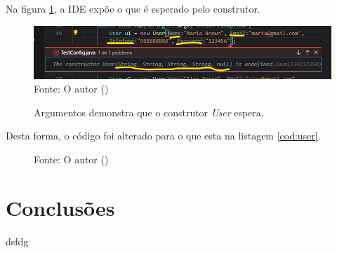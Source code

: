 \par Na figura \ref{fig:sugconstrutor}, a IDE expõe o que é esperado pelo construtor.

\begin{figure}[H]
  \caption{Argumentos demonstra que o construtor \textit{User} espera.}
  \includegraphics[scale=0.8]{figure/user_jaova.png}
  \label{fig:sugconstrutor}
  \flushleft %
  {\fontsize{10pt}{\baselineskip}\selectfont  Fonte: O autor (\the\year) }
\end{figure}
\par Desta forma, o código foi alterado para o que esta na listagem \ref{cod:user}.


\begin{figure}[H]
  \flushleft %
  {\fontsize{10pt}{\baselineskip}\selectfont  Fonte: O autor (\the\year) }
\end{figure}



\section{Conclusões}


dsfdg

